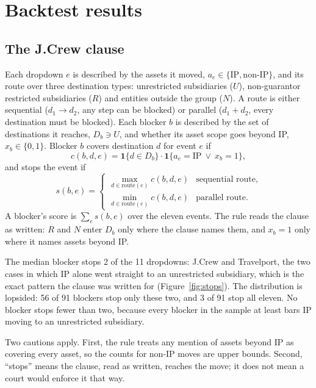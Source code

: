 \documentclass[12pt]{article}
\begin{document}
\section{Backtest results}\label{sec:results}
\subsection{The J.Crew clause}\label{sec:clause}
Each dropdown $e$ is described by the assets it moved, $a_e\in\{\text{IP},\text{non-IP}\}$, and its route over three destination types: unrestricted subsidiaries ($U$), non-guarantor restricted subsidiaries ($R$) and entities outside the group ($N$). A route is either sequential ($d_1\to d_2$, any step can be blocked) or parallel ($d_1+d_2$, every destination must be blocked). Each blocker $b$ is described by the set of destinations it reaches, $D_b\ni U$, and whether its asset scope goes beyond IP, $x_b\in\{0,1\}$. Blocker $b$ covers destination $d$ for event $e$ if
\begin{equation}
c(b,d,e)=\mathbf{1}\{d\in D_b\}\cdot\mathbf{1}\{a_e=\text{IP}\ \lor\ x_b=1\},
\end{equation}
and stops the event if
\begin{equation}
s(b,e)=\begin{cases}\max_{d\in\text{route}(e)} c(b,d,e) & \text{sequential route},\\ \min_{d\in\text{route}(e)} c(b,d,e) & \text{parallel route}.\end{cases}
\end{equation}
A blocker's score is $\sum_{e}s(b,e)$ over the eleven events. The rule reads the clause as written: $R$ and $N$ enter $D_b$ only where the clause names them, and $x_b=1$ only where it names assets beyond IP.

The median blocker stops 2 of the 11 dropdowns: J.Crew and Travelport, the two cases in which IP alone went straight to an unrestricted subsidiary, which is the exact pattern the clause was written for (Figure~\ref{fig:stops}). The distribution is lopsided: 56 of 91 blockers stop only these two, and 3 of 91 stop all eleven. No blocker stops fewer than two, because every blocker in the sample at least bars IP moving to an unrestricted subsidiary.

Two cautions apply. First, the rule treats any mention of assets beyond IP as covering every asset, so the counts for non-IP moves are upper bounds. Second, ``stops'' means the clause, read as written, reaches the move; it does not mean a court would enforce it that way.
\end{document}
